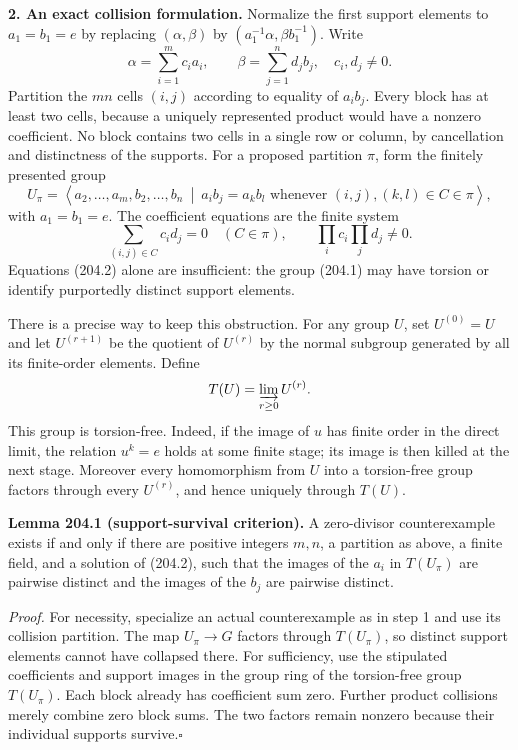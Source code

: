 \documentclass[11pt,a4paper]{article}
\begin{document}
\textbf{2. An exact collision formulation.}
Normalize the first support elements to $a_1=b_1=e$ by replacing
$(\alpha,\beta)$ by $(a_1^{-1}\alpha,\beta b_1^{-1})$. Write
\[
 \alpha=\sum_{i=1}^m c_i a_i,\qquad
 \beta=\sum_{j=1}^n d_j b_j,
 \quad c_i,d_j\ne0.
\]
Partition the $mn$ cells $(i,j)$ according to equality of $a_i b_j$.
Every block has at least two cells, because a uniquely represented product
would have a nonzero coefficient. No block contains two cells in a
single row or column, by cancellation and distinctness of the supports.
For a proposed partition $\pi$, form the finitely presented group
\[
 U_\pi=\left\langle a_2,\ldots,a_m,b_2,\ldots,b_n\ \middle|\
 a_i b_j=a_kb_l\text{ whenever }(i,j),(k,l)\in C\in\pi
 \right\rangle, \tag{204.1}
\]
with $a_1=b_1=e$. The coefficient equations are the finite system
\[
 \sum_{(i,j)\in C}c_i d_j=0\quad(C\in\pi),
 \qquad \prod_i c_i\prod_jd_j\ne0. \tag{204.2}
\]
Equations (204.2) alone are insufficient: the group (204.1) may have
torsion or identify purportedly distinct support elements.

There is a precise way to keep this obstruction. For any group $U$, set
$U^{(0)}=U$ and let $U^{(r+1)}$ be the quotient of $U^{(r)}$ by the
normal subgroup generated by all its finite-order elements. Define
\[
 T(U)=\varinjlim_{r\ge0}U^{(r)}.
\]
This group is torsion-free. Indeed, if the image of $u$ has finite order
in the direct limit, the relation $u^k=e$ holds at some finite stage;
its image is then killed at the next stage. Moreover every homomorphism
from $U$ into a torsion-free group factors through every $U^{(r)}$,
and hence uniquely through $T(U)$.

\textbf{Lemma 204.1 (support-survival criterion).}
A zero-divisor counterexample exists if and only if there are positive
integers $m,n$, a partition as above, a finite field, and a solution of
(204.2), such that the images of the $a_i$ in $T(U_\pi)$ are pairwise
distinct and the images of the $b_j$ are pairwise distinct.

\emph{Proof.}
For necessity, specialize an actual counterexample as in step 1 and use
its collision partition. The map $U_\pi\to G$ factors through
$T(U_\pi)$, so distinct support elements cannot have collapsed there.
For sufficiency, use the stipulated coefficients and support images in
the group ring of the torsion-free group $T(U_\pi)$. Each block already
has coefficient sum zero. Further product collisions merely combine
zero block sums. The two factors remain nonzero because their individual
supports survive.\hfill$\square$
\end{document}
